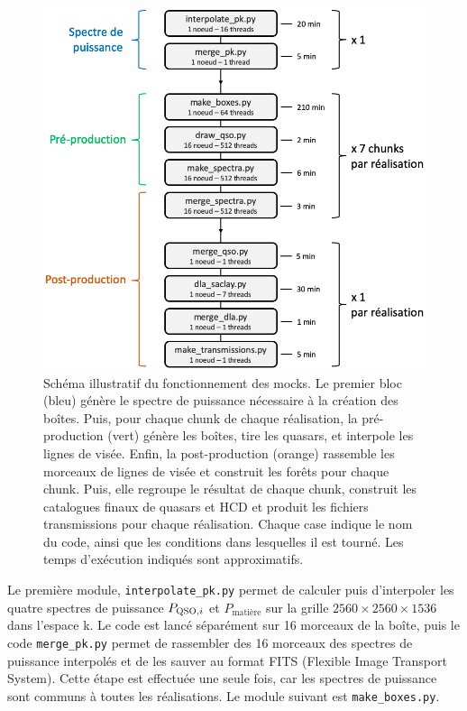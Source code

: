 \begin{figure}
  \centering
  \includegraphics[scale=0.55]{schema_prod}
  \caption{Schéma illustratif du fonctionnement des mocks. Le premier bloc (bleu) génère le spectre de puissance nécessaire à la création des boîtes. Puis, pour chaque chunk de chaque réalisation, la pré-production (vert) génère les boîtes, tire les quasars, et interpole les lignes de visée. Enfin, la post-production (orange) rassemble les morceaux de lignes de visée et construit les forêts \lya{} pour chaque chunk. Puis, elle regroupe le résultat de chaque chunk, construit les catalogues finaux de quasars et HCD et produit les fichiers transmissions pour chaque réalisation. Chaque case indique le nom du code, ainsi que les conditions dans lesquelles il est tourné. Les temps d'exécution indiqués sont approximatifs.}
  \label{fig:schema_prod}
\end{figure}
Le première module, \texttt{interpolate\_pk.py} permet de calculer puis d'interpoler les quatre spectres de puissance $P_{\textsc{QSO},i}$ et $P_{\mathrm{matière}}$ sur la grille $\num{2560}\times\num{2560}\times\num{1536}$ dans l'espace k. Le code est lancé séparément sur 16 morceaux de la boîte, puis le code \texttt{merge\_pk.py} permet de rassembler des 16 morceaux des spectres de puissance interpolés et de les sauver au format FITS (Flexible Image Transport System). Cette étape est effectuée une seule fois, car les spectres de puissance sont communs à toutes les réalisations. Le module suivant est \texttt{make\_boxes.py}.
